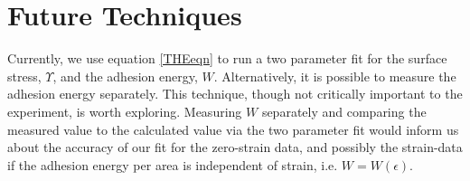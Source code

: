 \section{Future Techniques}
Currently, we use equation \ref{THEeqn} to run a two parameter fit for the surface stress, $ \Upsilon $, and the adhesion energy, $ W $. Alternatively, it is possible to measure the adhesion energy separately. This technique, though not critically important to the experiment, is worth exploring. Measuring $ W $ separately and comparing the measured value to the calculated value via the two parameter fit would inform us about the accuracy of our fit for the zero-strain data, and possibly the strain-data if the adhesion energy per area is independent of strain, i.e. $ W = W(\epsilon) $.   

